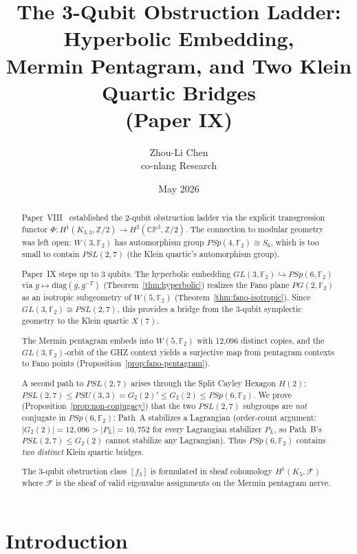 \documentclass[11pt,a4paper]{article}
\title{The 3-Qubit Obstruction Ladder: Hyperbolic Embedding,\\
       Mermin Pentagram, and Two Klein Quartic Bridges\\
       {\large (Paper IX)}}
\author{Zhou-Li Chen \\ co-nlang Research}
\date{May 2026}
\theoremstyle{remark}
\newcommand{\CP}{\mathbb{CP}}
\newcommand{\Z}{\mathbb{Z}}
\newcommand{\F}{\mathbb{F}}
\newcommand{\cF}{\mathcal{F}}
\begin{document}
\maketitle

\begin{abstract}
  Paper~VIII~\cite{PaperVIII} established the 2-qubit obstruction ladder via
  the explicit transgression functor $\Phi: H^1(K_{3,3}, \Z/2) \to H^2(\CP^3, \Z/2)$.
  The connection to modular geometry was left open: $W(3, \F_2)$ has automorphism
  group $PSp(4, \F_2) \cong S_6$, which is too small to contain $PSL(2, 7)$
  (the Klein quartic's automorphism group).

  Paper~IX steps up to 3 qubits. The hyperbolic embedding
  $GL(3, \F_2) \hookrightarrow PSp(6, \F_2)$ via $g \mapsto \mathrm{diag}(g, g^{-T})$
  (Theorem~\ref{thm:hyperbolic}) realizes the Fano plane $PG(2, \F_2)$ as an
  isotropic subgeometry of $W(5, \F_2)$ (Theorem~\ref{thm:fano-isotropic}).
  Since $GL(3, \F_2) \cong PSL(2, 7)$, this provides a bridge from the 3-qubit
  symplectic geometry to the Klein quartic $X(7)$.

  The Mermin pentagram embeds into $W(5, \F_2)$ with 12{,}096 distinct
  copies, and the $GL(3, \F_2)$-orbit of the GHZ context yields a
  surjective map from pentagram contexts to Fano points
  (Proposition~\ref{prop:fano-pentagram}).

  A second path to $PSL(2, 7)$ arises through the Split Cayley Hexagon
  $H(2)$: $PSL(2, 7) \leq PSU(3, 3) = G_2(2)' \leq G_2(2) \leq PSp(6, \F_2)$.
  We prove (Proposition~\ref{prop:non-conjugacy}) that the two $PSL(2, 7)$
  subgroups are \emph{not} conjugate in $PSp(6, \F_2)$: Path~A stabilizes a
  Lagrangian (order-count argument: $|G_2(2)| = 12{,}096 >
  |P_L| = 10{,}752$ for every Lagrangian stabilizer $P_L$, so Path~B's
  $PSL(2,7) \leq G_2(2)$ cannot stabilize any Lagrangian). Thus
  $PSp(6, \F_2)$ contains \emph{two distinct} Klein quartic bridges.

  The 3-qubit obstruction class $[f_3]$ is formulated in sheaf cohomology
  $H^1(K_5, \cF)$ where $\cF$ is the sheaf of valid eigenvalue assignments
  on the Mermin pentagram nerve.
\end{abstract}

\section{Introduction}
\label{sec:intro}
\end{document}

